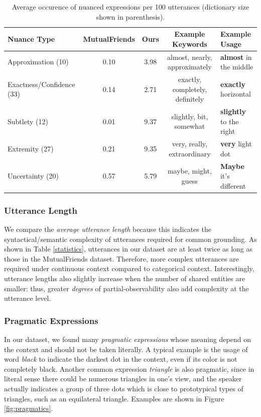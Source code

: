 \documentclass[letterpaper]{article}
\begin{document}
\begin{table}[ht]
\centering
\begin{tabular}{l|cc|c|l}
\toprule
Nuance Type & MutualFriends & Ours & Example Keywords & Example Usage \\
\midrule
Approximation (10) & 0.10 & 3.98 & almost, nearly, approximately & \textbf{almost} in the middle \\
Exactness/Confidence (33) & 0.14 & 2.71 & exactly, completely, definitely & \textbf{exactly} horizontal \\
Subtlety (12) & 0.01 & 9.37 & slightly, bit, somewhat & \textbf{slightly} to the right \\
Extremity (27) & 0.21 & 9.35 & very, really, extraordinary & \textbf{very} light dot \\
Uncertainty (20) & 0.57 & 5.79 & maybe, might, guess & \textbf{Maybe} it's different \\
\bottomrule
\end{tabular}
\caption{\label{nuances}
Average occurence of nuanced expressions per 100 utterances (dictionary size shown in parenthesis).
}
\end{table}

\subsubsection{Utterance Length}

We compare the \emph{average utterance length} because this indicates the syntactical/semantic complexity of utterances required for common grounding. As shown in Table \ref{statistics}, utterances in our dataset are at least twice as long as those in the MutualFriends dataset. Therefore, more complex utterances are required under continuous context compared to categorical context. Interestingly, utterance lengths also slightly increase when the number of shared entities are smaller: thus, greater \emph{degrees} of partial-observability also add complexity at the utterance level.

\subsubsection{Pragmatic Expressions}

In our dataset, we found many \emph{pragmatic expressions} whose meaning depend on the context and should not be taken literally. A typical example is the usage of word \textit{black} to indicate the darkest dot in the context, even if its color is not completely black. Another common expression \textit{triangle} is also pragmatic, since in literal sense there could be numerous triangles in one's view, and the speaker actually indicates a group of three dots which is close to prototypical types of triangles, such as an equilateral triangle. Examples are shown in Figure \ref{fig:pragmatics}.
\end{document}
